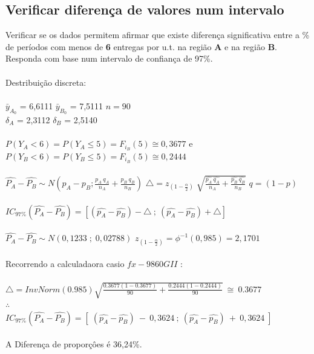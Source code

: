 \subsection{Verificar diferença de valores num intervalo}
\noindent
Verificar se os dados permitem afirmar que existe diferença significativa entre a \% de períodos com menos de \textbf{6} entregas por u.t. na região \textbf{A} e na região \textbf{B}. Responda com base num intervalo de confiança de 97\%. \\
\\
Destribuição discreta: \\
\\
$\bar{y}_{A_0}$ = 6,6111 \qquad $\bar{y}_{B_0}$ = 7,5111 \qquad $n=90$ \\
$\delta_A$ = 2,3112 \qquad $\delta_B$ = 2,5140 \\
\\
$P(Y_A < 6)=P(Y_A \leqslant 5)=F_{i_B}(5) \cong 0,3677 $  \quad e \quad $P(Y_B < 6)=P(Y_B \leqslant 5)=F_{i_B}(5) \cong 0,2444$ \\
\\
$\hat{P_A}-\hat{P_B} \sim N \left( p_A - p_B ; \frac{p_A\:q_A}{n_A} + \frac{p_B\:q_B}{n_B}\right)$ \hspace{1cm}
$\triangle=z_{(1-\frac{\alpha}{2})} \;\sqrt{\frac{\hat{p_A} \: \hat{q_A}}{n_A}+\frac{\hat{p_B} \: \hat{q_B}}{n_B}}$ \hspace{1cm} $q=(1-p)$ \\
\\
$IC_{97\%}(\hat{P_A}-\hat{P_B})=\left[(\hat{p_A}-\hat{p_B})-\triangle \: ; \: (\hat{p_A}-\hat{p_B})+\triangle \right]$ \\
\\
$\hat{P_A}-\hat{P_B} \sim N \left( 0,1233 \; ; \; 0,02788\right)$ \hspace{1cm}
$z_{(1-\frac{\alpha}{2})}=\phi^{-1}(0,985)=2,1701$ \\
\\
Recorrendo a calculadaora casio $fx-9860GII$ : \\
\\
$\triangle= InvNorm(0.985)\sqrt{\frac{0.3677(1-0.3677)}{90}+\frac{0.2444(1-0.2444)}{90}}\: \cong \:0.3677$
\\
$\therefore$
\\
$IC_{97\%}(\hat{P_A}-\hat{P_B})=\left[ \; (\hat{p_A}-\hat{p_B}) \:-\: 0,3624 \: ; \: (\hat{p_A}-\hat{p_B}) \:+\: 0,3624 \; \right]$ \\
\\
A Diferença de proporçôes é 36,24\%.
